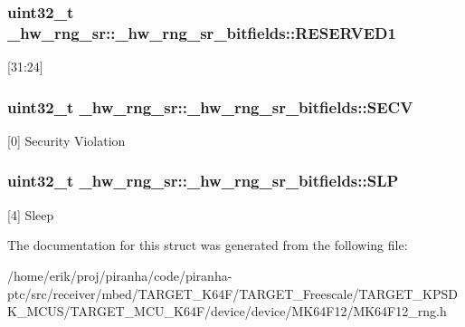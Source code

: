 \subsubsection[{\texorpdfstring{R\+E\+S\+E\+R\+V\+E\+D1}{RESERVED1}}]{\setlength{\rightskip}{0pt plus 5cm}uint32\+\_\+t \+\_\+hw\+\_\+rng\+\_\+sr\+::\+\_\+hw\+\_\+rng\+\_\+sr\+\_\+bitfields\+::\+R\+E\+S\+E\+R\+V\+E\+D1}\hypertarget{struct__hw__rng__sr_1_1__hw__rng__sr__bitfields_a4fff69f633073861fc42097ba59bf876}{}\label{struct__hw__rng__sr_1_1__hw__rng__sr__bitfields_a4fff69f633073861fc42097ba59bf876}
\mbox{[}31\+:24\mbox{]} 
\subsubsection[{\texorpdfstring{S\+E\+CV}{SECV}}]{\setlength{\rightskip}{0pt plus 5cm}uint32\+\_\+t \+\_\+hw\+\_\+rng\+\_\+sr\+::\+\_\+hw\+\_\+rng\+\_\+sr\+\_\+bitfields\+::\+S\+E\+CV}\hypertarget{struct__hw__rng__sr_1_1__hw__rng__sr__bitfields_a8568ac8680c40b429f54b78d957f0931}{}\label{struct__hw__rng__sr_1_1__hw__rng__sr__bitfields_a8568ac8680c40b429f54b78d957f0931}
\mbox{[}0\mbox{]} Security Violation 
\subsubsection[{\texorpdfstring{S\+LP}{SLP}}]{\setlength{\rightskip}{0pt plus 5cm}uint32\+\_\+t \+\_\+hw\+\_\+rng\+\_\+sr\+::\+\_\+hw\+\_\+rng\+\_\+sr\+\_\+bitfields\+::\+S\+LP}\hypertarget{struct__hw__rng__sr_1_1__hw__rng__sr__bitfields_a945eb42ba7495e5c5f0bf35aa774c072}{}\label{struct__hw__rng__sr_1_1__hw__rng__sr__bitfields_a945eb42ba7495e5c5f0bf35aa774c072}
\mbox{[}4\mbox{]} Sleep 

The documentation for this struct was generated from the following file\+:\begin{DoxyCompactItemize}
\item 
/home/erik/proj/piranha/code/piranha-\/ptc/src/receiver/mbed/\+T\+A\+R\+G\+E\+T\+\_\+\+K64\+F/\+T\+A\+R\+G\+E\+T\+\_\+\+Freescale/\+T\+A\+R\+G\+E\+T\+\_\+\+K\+P\+S\+D\+K\+\_\+\+M\+C\+U\+S/\+T\+A\+R\+G\+E\+T\+\_\+\+M\+C\+U\+\_\+\+K64\+F/device/device/\+M\+K64\+F12/M\+K64\+F12\+\_\+rng.\+h\end{DoxyCompactItemize}
